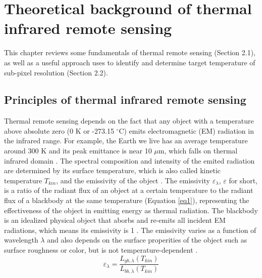 \chapter{Theoretical background of thermal infrared remote sensing}

\label{Chapter2}

This chapter reviews some fundamentals of thermal remote sensing (Section 2.1), as well as a useful approach uses to identify and determine target temperature of sub-pixel resolution (Section 2.2). \\


\section{Principles of thermal infrared remote sensing}
Thermal remote sensing depends on the fact that any object with a temperature above absolute zero (0 K or -273.15 $^\circ$C) emits electromagnetic (EM) radiation in the infrared range. For example, the Earth we live has an average temperature around 300 K and its peak emittance is near 10 $\mu$m, which falls on thermal infrared domain \parencite {Reference201, Reference202}. The spectral composition and intensity of the emited radiation are determined by its surface temperature, which is also called kinetic temperature $T_{kin}$,  and the emissivity of the object \parencite{Reference207}. The emissivity $\varepsilon_{\lambda}$, $\varepsilon$ for short, is a ratio of the radiant flux of an object at a certain temperature to the radiant flux of a blackbody at the same temperature (Equation \eqref{eq1}), representing the effectiveness of the object in emitting energy as thermal radiation. The blackbody is an idealized physical object that aborbs and re-emits all incident EM radiations, which means its emissivity is 1 \parencite{Reference206, Reference204}. The emissivity varies as a function of wavelength $\lambda$ and also depends on the surface properities of the object such as surface roughness or color, but is not temperature-dependent \parencite{Reference203}.\\
\begin{equation}
\label{eq1}
\varepsilon_{\lambda} = \frac{L_{gb, \lambda}(T_{kin})}{L_{bb, \lambda}(T_{kin})}
\end{equation}

